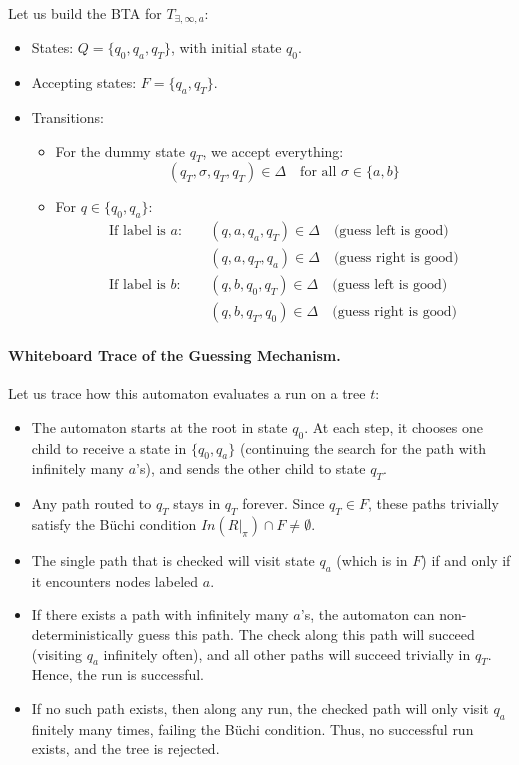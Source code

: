 Let us build the BTA for $T_{\exists, \infty, a}$:
\begin{itemize}
    \item States: $Q = \{q_0, q_a, q_T\}$, with initial state $q_0$.
    \item Accepting states: $F = \{q_a, q_T\}$.
    \item Transitions:
    \begin{itemize}
        \item For the dummy state $q_T$, we accept everything:
        $$(q_T, \sigma, q_T, q_T) \in \Delta \quad \text{for all } \sigma \in \{a, b\}$$
        \item For $q \in \{q_0, q_a\}$:
        \begin{align*}
            \text{If label is } a: \quad & (q, a, q_a, q_T) \in \Delta \quad \text{(guess left is good)} \\
                                       & (q, a, q_T, q_a) \in \Delta \quad \text{(guess right is good)} \\
            \text{If label is } b: \quad & (q, b, q_0, q_T) \in \Delta \quad \text{(guess left is good)} \\
                                       & (q, b, q_T, q_0) \in \Delta \quad \text{(guess right is good)}
        \end{align*}
    \end{itemize}
\end{itemize}

\paragraph{Whiteboard Trace of the Guessing Mechanism.}
Let us trace how this automaton evaluates a run on a tree $t$:
\begin{itemize}
    \item The automaton starts at the root in state $q_0$. At each step, it chooses one child to receive a state in $\{q_0, q_a\}$ (continuing the search for the path with infinitely many $a$'s), and sends the other child to state $q_T$.
    \item Any path routed to $q_T$ stays in $q_T$ forever. Since $q_T \in F$, these paths trivially satisfy the Büchi condition $In(R|_\pi) \cap F \neq \emptyset$.
    \item The single path that is checked will visit state $q_a$ (which is in $F$) if and only if it encounters nodes labeled $a$.
    \item If there exists a path with infinitely many $a$'s, the automaton can non-deterministically guess this path. The check along this path will succeed (visiting $q_a$ infinitely often), and all other paths will succeed trivially in $q_T$. Hence, the run is successful.
    \item If no such path exists, then along any run, the checked path will only visit $q_a$ finitely many times, failing the Büchi condition. Thus, no successful run exists, and the tree is rejected.
\end{itemize}


